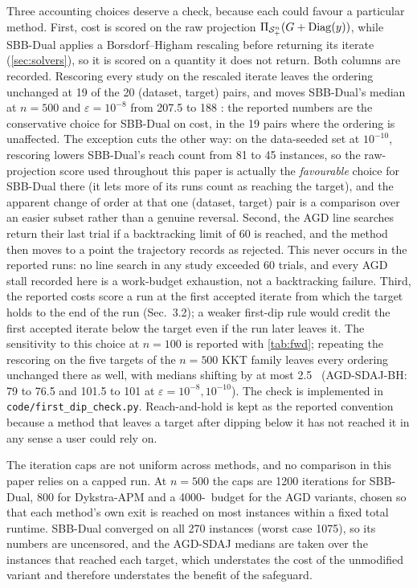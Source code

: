 Three accounting choices deserve a check, because each could favour a
particular method. First, cost is scored on the raw projection
$\Pi_{\mathcal{S}_+^n}(G+\operatorname{Diag}(y))$, while SBB-Dual applies a Borsdorf--Higham rescaling before
returning its iterate (\cref{sec:solvers}), so it is scored on a quantity it
does not return. Both columns are recorded. Rescoring every study on the
rescaled iterate leaves the ordering unchanged at 19 of the 20
(dataset, target) pairs, and moves SBB-Dual's median at $n=500$ and
$\varepsilon=10^{-8}$ from 207.5 to 188 \EVDs: the reported numbers are the
conservative choice for SBB-Dual on cost, in the 19 pairs where the ordering
is unaffected. The exception cuts the other way: on the data-seeded set at
$10^{-10}$, rescoring lowers SBB-Dual's reach count from 81 to 45 instances,
so the raw-projection score used throughout this paper is actually the
\emph{favourable} choice for SBB-Dual there (it lets more of its runs count
as reaching the target), and the apparent change of order at that one
(dataset, target) pair is a comparison over an easier subset rather than a
genuine reversal. Second, the AGD line searches return
their last trial if a backtracking limit of 60 is reached, and the method then
moves to a point the trajectory records as rejected. This never occurs in the
reported runs: no line search in any study exceeded 60 trials, and every
AGD stall recorded here is a work-budget exhaustion, not a backtracking
failure. Third, the reported costs score a run at the first accepted iterate
from which the target holds to the end of the run (Sec.~3.2); a weaker
first-dip rule would credit the first accepted iterate below the target even
if the run later leaves it. The sensitivity to this choice at $n=100$ is
reported with \cref{tab:fwd}; repeating the rescoring on the five targets of
the $n=500$ KKT family leaves every ordering unchanged there as well, with
medians shifting by at most 2.5 \EVDs\ (AGD-SDAJ-BH: 79 to 76.5 and 101.5 to
101 at $\varepsilon=10^{-8},10^{-10}$). The check is
implemented in \texttt{code/first\_dip\_check.py}. Reach-and-hold is kept as
the reported convention because a method that leaves a target after dipping
below it has not reached it in any sense a user could rely on.

The iteration caps are not uniform across methods, and no comparison in this
paper relies on a capped run. At $n=500$ the caps are 1200 iterations for
SBB-Dual, 800 for Dykstra-APM and a 4000-\EVD\ budget for the AGD variants,
chosen so that each method's own exit is reached on most instances within a
fixed total runtime. SBB-Dual converged on all 270 instances (worst case
1075), so its numbers are uncensored, and the AGD-SDAJ medians are taken over
the instances that reached each target, which understates the cost of the
unmodified variant and therefore understates the benefit of the safeguard.

